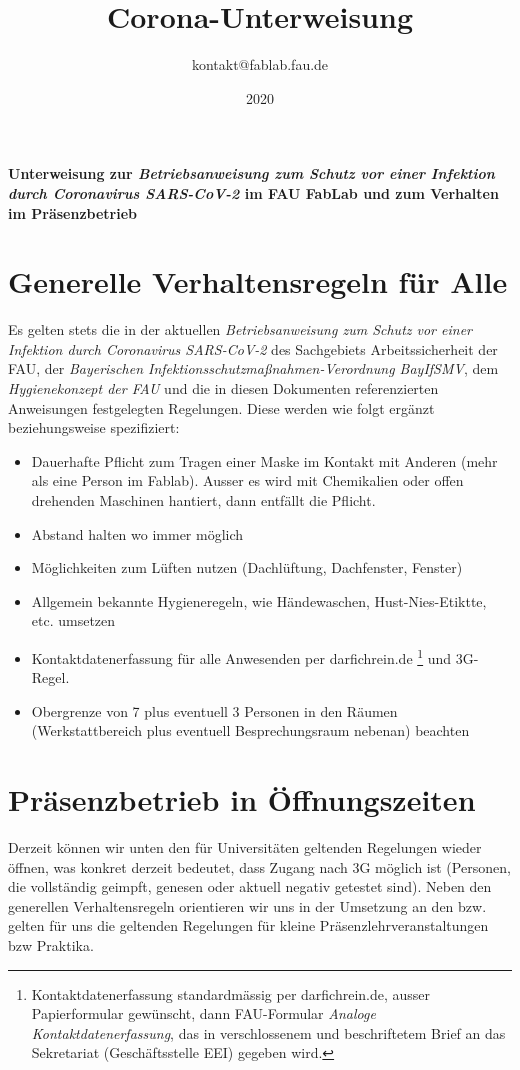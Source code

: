 \documentclass[13pt]{\basedir/fablab-document}
\date{2020}
\author{kontakt@fablab.fau.de}
\title{Corona-Unterweisung}
\begin{document}
\maketitle

\begin{center}
  \textbf{Unterweisung zur \emph{Betriebsanweisung zum Schutz vor einer Infektion durch Coronavirus SARS-CoV-2} im FAU FabLab und zum Verhalten im Präsenzbetrieb}
\end{center}

\vbox{\vspace{1cm}}


\section{Generelle Verhaltensregeln für Alle}
Es gelten stets die in der aktuellen 
\emph{Betriebsanweisung zum Schutz vor einer Infektion durch Coronavirus SARS-CoV-2} des Sachgebiets Arbeitssicherheit der FAU, 
der \emph{Bayerischen Infektionsschutzmaßnahmen-Verordnung BayIfSMV}, 
dem \emph{Hygienekonzept der FAU} und 
die in diesen Dokumenten referenzierten Anweisungen 
festgelegten Regelungen. Diese werden wie folgt ergänzt beziehungsweise spezifiziert: 

\begin{itemize}
  \item  Dauerhafte Pflicht zum Tragen einer Maske im Kontakt mit Anderen (mehr als eine Person im Fablab). Ausser es wird mit Chemikalien oder offen drehenden Maschinen hantiert, dann entfällt die Pflicht.
  \item  Abstand halten wo immer möglich
  \item  Möglichkeiten zum Lüften nutzen (Dachlüftung, Dachfenster, Fenster)
  \item  Allgemein bekannte Hygieneregeln, wie Händewaschen, Hust-Nies-Etiktte, etc. umsetzen
  \item  Kontaktdatenerfassung für alle Anwesenden per darfichrein.de \footnote{Kontaktdatenerfassung standardmässig per darfichrein.de, ausser Papierformular gewünscht, dann FAU-Formular \emph{Analoge Kontaktdatenerfassung}, das in verschlossenem und beschriftetem Brief an das Sekretariat (Geschäftsstelle EEI) gegeben wird.} und 3G-Regel. 
  \item  Obergrenze von 7 plus eventuell 3 Personen in den Räumen (Werkstattbereich plus eventuell Besprechungsraum nebenan) beachten
\end{itemize}


\section{Präsenzbetrieb in Öffnungszeiten}
Derzeit können wir unten den für Universitäten geltenden Regelungen wieder öffnen, was konkret derzeit bedeutet, dass Zugang nach 3G möglich ist (Personen, die vollständig geimpft, genesen oder aktuell negativ getestet sind).
Neben den generellen Verhaltensregeln orientieren wir uns in der Umsetzung an den bzw. gelten für uns die geltenden Regelungen für kleine Präsenzlehrveranstaltungen bzw Praktika.
\end{document}
